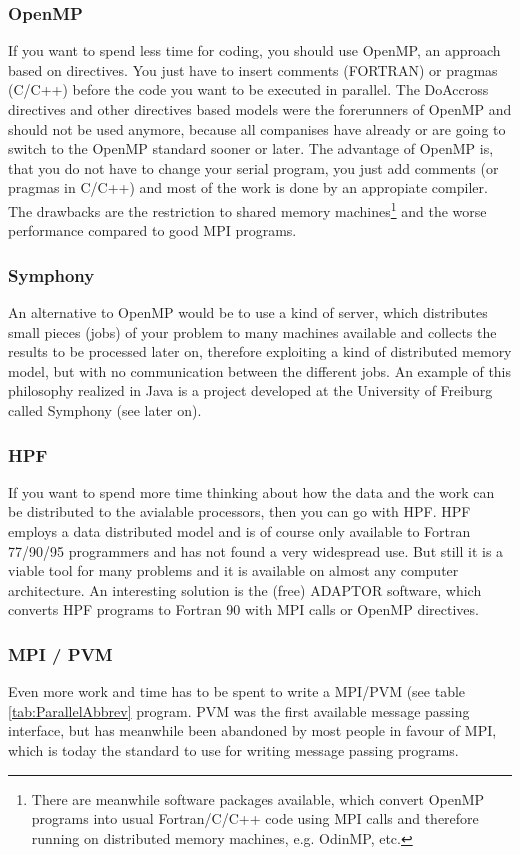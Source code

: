 \subsubsection{OpenMP}
If you want to spend
less time for coding, you should use OpenMP, an approach based on
directives.
You just have to insert comments (FORTRAN) or pragmas (C/C++) before the 
code you want to be executed in parallel.
The DoAccross directives and other directives based models were the
forerunners of OpenMP and should not be used anymore, because
all companises have already or are going to switch to the OpenMP
standard sooner or later. The advantage of OpenMP is,
that you do not have to change your serial program, you just add comments
(or pragmas in C/C++) and most of the work is done by an appropiate compiler.
The drawbacks are the restriction to shared memory machines\footnote{There are
meanwhile software packages available, which convert OpenMP programs into 
usual Fortran/C/C++ code using MPI calls and therefore running on
distributed memory machines, e.g. OdinMP, etc.}
and the worse performance compared to good MPI programs.

\subsubsection{Symphony}
An alternative to OpenMP would be to use a kind of server, which distributes
small pieces (jobs) of your problem to many machines available and collects
the results to be processed later on, therefore exploiting a kind of distributed memory
model, but with no communication between the different jobs.
An example of this philosophy
realized in Java is a project developed at the University of Freiburg called
Symphony (see later on). 

\subsubsection{HPF}
If you want to spend more time thinking about how the data and the 
work can be distributed to the avialable processors, then you can go with 
HPF. HPF employs a data distributed model and 
is of course only available to Fortran 77/90/95 programmers and
has not found a very widespread use. But still it is a viable tool for
many problems and it is available on almost any computer architecture.
An interesting solution is the (free) ADAPTOR software, which converts HPF programs
to Fortran 90 with MPI calls or OpenMP directives. 

\subsubsection{MPI / PVM}
Even more work and time has to be spent to write a MPI/PVM (see table
\ref{tab:ParallelAbbrev} program. PVM was
the first available message passing interface, but has meanwhile been
abandoned by most people in favour of MPI, which is today the standard to use
for writing message passing programs. 


